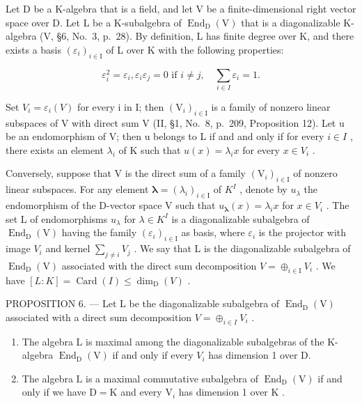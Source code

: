 Let D be a K-algebra that is a field, and let V be a finite-dimensional right vector space over D. Let L be a K-subalgebra of \(\operatorname{End}_{\mathrm{D}}(\mathrm{V})\) that is a diagonalizable K-algebra (V, §6, No.~3, p.~28). By definition, L has finite degree over K, and there exists a basis \((\varepsilon_{i})_{i\in\mathrm{I}}\) of L over K with the following properties:

\[
\varepsilon_ {i} ^ {2} = \varepsilon_ {i}, \varepsilon_ {i} \varepsilon_ {j} = 0 \text { if } i \neq j, \quad \sum_ {i \in I} \varepsilon_ {i} = 1.
\]

Set \(V_{i} = \varepsilon_{i}(V)\) for every i in I; then \((\mathrm{V}_{i})_{i \in \mathrm{I}}\) is a family of nonzero linear subspaces of V with direct sum V (II, §1, No.~8, p.~209, Proposition 12). Let u be an endomorphism of V; then u belongs to L if and and only if for every \(i \in I\) , there exists an element \(\lambda_{i}\) of K such that \(u(x) = \lambda_{i}x\) for every \(x \in V_{i}\) .

Conversely, suppose that V is the direct sum of a family \((\mathrm{V}_{i})_{i\in\mathrm{I}}\) of nonzero linear subspaces. For any element \(\boldsymbol{\lambda}=(\lambda_{i})_{i\in\mathrm{I}}\) of \(K^{I}\) , denote by \(u_{\lambda}\) the endomorphism of the D-vector space V such that \(u_{\boldsymbol{\lambda}}(x)=\lambda_{i}x\) for \(x\in V_{i}\) . The set L of endomorphisms \(u_{\lambda}\) for \(\lambda\in K^{I}\) is a diagonalizable subalgebra of \(\operatorname{End}_{\mathrm{D}}(\mathrm{V})\) having the family \((\varepsilon_{i})_{i\in\mathrm{I}}\) as basis, where \(\varepsilon_{i}\) is the projector with image \(V_{i}\) and kernel \(\sum_{j\neq i}V_{j}\) . We say that L is the diagonalizable subalgebra of \(\operatorname{End}_{\mathrm{D}}(\mathrm{V})\) associated with the direct sum decomposition \(V=\oplus_{i\in\mathrm{I}}V_{i}\) . We have \([L:K]=\operatorname{Card}(I)\leqslant\dim_{\mathrm{D}}(V)\) .

PROPOSITION 6. --- Let L be the diagonalizable subalgebra of \(\operatorname{End}_{\mathrm{D}}(\mathrm{V})\) associated with a direct sum decomposition \(V = \oplus_{i \in I} V_i\) .

\begin{enumerate}
\def\labelenumi{\alph{enumi})}
\item
  The algebra L is maximal among the diagonalizable subalgebras of the K-algebra \(\operatorname{End}_{\mathrm{D}}(\mathrm{V})\) if and only if every \(V_{i}\) has dimension 1 over D.
\item
  The algebra \(\mathrm{L}\) is a maximal commutative subalgebra of \(\operatorname{End}_{\mathrm{D}}(\mathrm{V})\) if and only if we have \(\mathrm{D} = \mathrm{K}\) and every \(\mathrm{V}_i\) has dimension 1 over \(\mathrm{K}\) .
\end{enumerate}

